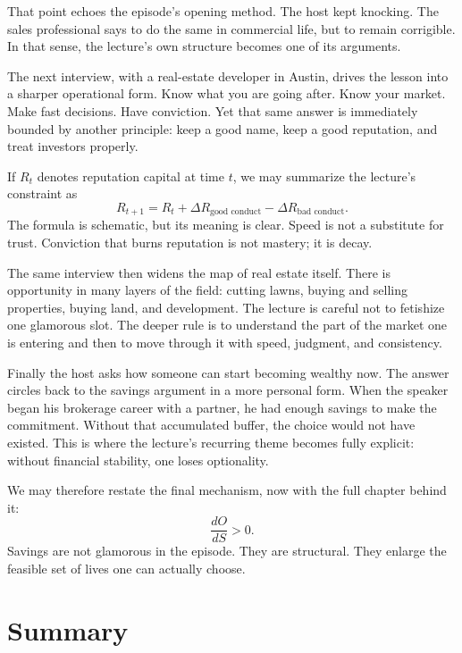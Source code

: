 That point echoes the episode's opening method. The host kept knocking. The sales professional says to do the same in commercial life, but to remain corrigible. In that sense, the lecture's own structure becomes one of its arguments.

The next interview, with a real-estate developer in Austin, drives the lesson into a sharper operational form. Know what you are going after. Know your market. Make fast decisions. Have conviction. Yet that same answer is immediately bounded by another principle: keep a good name, keep a good reputation, and treat investors properly.

If \(R_t\) denotes reputation capital at time \(t\), we may summarize the lecture's constraint as
\begin{equation}
R_{t+1}=R_t+\Delta R_{\text{good conduct}}-\Delta R_{\text{bad conduct}}.
\end{equation}
The formula is schematic, but its meaning is clear. Speed is not a substitute for trust. Conviction that burns reputation is not mastery; it is decay.

The same interview then widens the map of real estate itself. There is opportunity in many layers of the field: cutting lawns, buying and selling properties, buying land, and development. The lecture is careful not to fetishize one glamorous slot. The deeper rule is to understand the part of the market one is entering and then to move through it with speed, judgment, and consistency.

Finally the host asks how someone can start becoming wealthy now. The answer circles back to the savings argument in a more personal form. When the speaker began his brokerage career with a partner, he had enough savings to make the commitment. Without that accumulated buffer, the choice would not have existed. This is where the lecture's recurring theme becomes fully explicit: without financial stability, one loses optionality.

We may therefore restate the final mechanism, now with the full chapter behind it:
\begin{equation}
\frac{dO}{dS}>0.
\end{equation}
Savings are not glamorous in the episode. They are structural. They enlarge the feasible set of lives one can actually choose.

\section{Summary}

